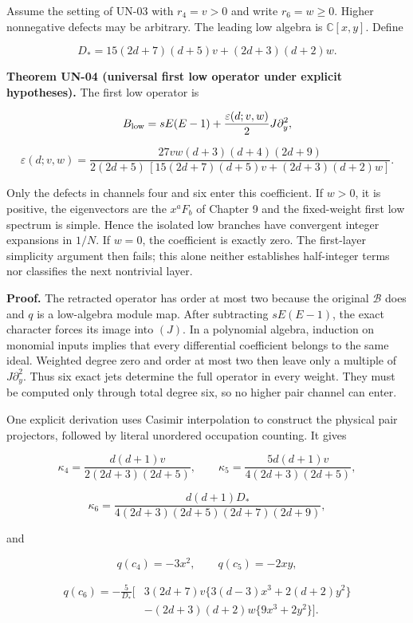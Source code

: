 \documentclass[a4paper,11pt]{article}
\numberwithin{equation}{section}
\begin{document}
Assume the setting of UN-03 with \(r_4=v>0\) and write \(r_6=w\geq0\). Higher nonnegative defects may be arbitrary. The leading low algebra is \(\mathbb C[x,y]\). Define

\[
D_*=15(2d+7)(d+5)v+(2d+3)(d+2)w.
\]

\textbf{Theorem UN-04 (universal first low operator under explicit hypotheses).} The first low operator is

\[
B_{\rm low}
=sE(E-1)+\frac{\varepsilon(d;v,w)}2J\partial_y^2,
\]

\[
\varepsilon(d;v,w)=
\frac{27vw(d+3)(d+4)(2d+9)}
{2(2d+5)\,[15(2d+7)(d+5)v+(2d+3)(d+2)w]}.
\]

Only the defects in channels four and six enter this coefficient. If \(w>0\), it is positive, the eigenvectors are the \(x^aF_b\) of Chapter 9 and the fixed-weight first low spectrum is simple. Hence the isolated low branches have convergent integer expansions in \(1/N\). If \(w=0\), the coefficient is exactly zero. The first-layer simplicity argument then fails; this alone neither establishes half-integer terms nor classifies the next nontrivial layer.

\textbf{Proof.} The retracted operator has order at most two because the original \(\mathscr B\) does and \(q\) is a low-algebra module map. After subtracting \(sE(E-1)\), the exact character forces its image into \((J)\). In a polynomial algebra, induction on monomial inputs implies that every differential coefficient belongs to the same ideal. Weighted degree zero and order at most two then leave only a multiple of \(J\partial_y^2\). Thus six exact jets determine the full operator in every weight. They must be computed only through total degree six, so no higher pair channel can enter.

One explicit derivation uses Casimir interpolation to construct the physical pair projectors, followed by literal unordered occupation counting. It gives

\[
\kappa_4=\frac{d(d+1)v}{2(2d+3)(2d+5)},\qquad
\kappa_5=\frac{5d(d+1)v}{4(2d+3)(2d+5)},
\]

\[
\kappa_6=
\frac{d(d+1)D_*}{4(2d+3)(2d+5)(2d+7)(2d+9)},
\]

and

\[
q(c_4)=-3x^2,\qquad q(c_5)=-2xy,
\]

\[
\begin{aligned}
q(c_6)=-\frac5{D_*}\big[
&3(2d+7)v\{3(d-3)x^3+2(d+2)y^2\}\\
&-(2d+3)(d+2)w\{9x^3+2y^2\}\big].
\end{aligned}
\]
\end{document}
